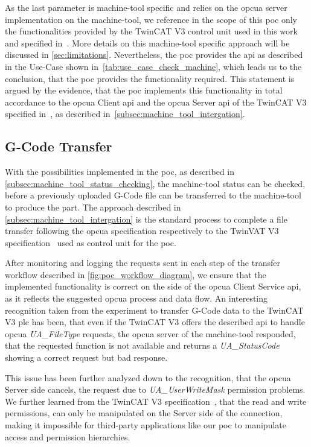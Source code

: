 \documentclass[
a4paper,
twoside,
headsepline,
cleardoublepage=empty,
parskip=half,
draft=false
]{scrbook}
\begin{document}
				As the last parameter is machine-tool specific and relies on the \gls{opcua} server implementation on the machine-tool, we reference in the scope of this \gls{poc} only the functionalities provided by the TwinCAT V3 control unit used in this work and specified in~\cite{twincat2018}. More details on this machine-tool specific approach will be discussed in \cref{sec:limitations}. Nevertheless, the \gls{poc} provides the \gls{api} as described in the Use-Case shown in~\cref{tab:use_case_check_machine}, which leads us to the conclusion, that the \gls{poc} provides the functionality required. This statement is argued by the evidence, that the \gls{poc} implements this functionality in total accordance to the \gls{opcua} Client \gls{api} and the \gls{opcua} Server \gls{api} of the TwinCAT V3 specified in~\cite{twincat2018}, as described in~\cref{subsec:machine_tool_intergation}.

			\subsection{G-Code Transfer}\label{subsec:g_code_transfer}

				With the possibilities implemented in the \gls{poc}, as described in \cref{subsec:machine_tool_status_checking}, the machine-tool status can be checked, before a previously uploaded G-Code file can be transferred to the machine-tool to produce the part. The approach described in \cref{subsec:machine_tool_intergation} is the standard process to complete a file transfer following the \gls{opcua} specification respectively to the TwinVAT V3 specification~\cite{twincat2018} used as control unit for the \gls{poc}.

				After monitoring and logging the requests sent in each step of the transfer workflow described in \cref{fig:poc_workflow_diagram}, we ensure that the implemented functionality is correct on the side of the \gls{opcua} Client Service \gls{api}, as it reflects the suggested \gls{opcua} process and data flow. An interesting recognition taken from the experiment to transfer G-Code data to the TwinCAT V3 \gls{plc} has been, that even if the TwinCAT V3 offers the described \gls{api} to handle \gls{opcua} \textit{UA\_FileType} requests, the \gls{opcua} server of the machine-tool responded, that the requested function is not available and returns a \textit{UA\_StatusCode} showing a correct request but bad response.
				
				This issue has been further analyzed down to the recognition, that the \gls{opcua} Server side cancels, the request due to \textit{UA\_UserWriteMask} permission problems. We further learned from the TwinCAT V3 specification~\cite{twincat2018}, that the read and write permissions, can only be manipulated on the Server side of the connection, making it impossible for third-party applications like our \gls{poc} to manipulate access and permission hierarchies. 
				
\end{document}
